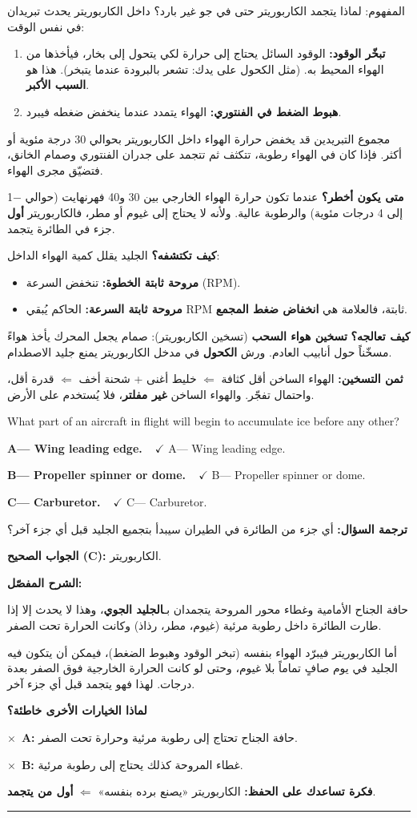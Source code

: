 \documentclass[11pt,a4paper]{article}
\newcommand{\en}[1]{\textenglish{#1}}
\newcommand{\correctletter}{}
\newcommand{\opt}[2]{%
  \ifdefstring{\correctletter}{#1}%
    {\textcolor{ansgreen}{\textbf{#1— #2\ \ $\checkmark$}}}%
    {#1— #2}\par}
\newcommand{\Q}[6]{%
  \renewcommand{\correctletter}{#6}%
  \par\bigskip
  \phantomsection\label{q#1}%
  \begin{tcolorbox}[enhanced,breakable,colback=qback,colframe=qframe,
      arc=2mm,boxrule=0.8pt,fonttitle=\bfseries,
      title={\en{Question #1}}]
    \begin{english}
      #2\par\smallskip
      \opt{A}{#3}\opt{B}{#4}\opt{C}{#5}
    \end{english}
  \end{tcolorbox}}
\newcommand{\tr}[1]{\textbf{\textcolor{qframe}{ترجمة السؤال:}} #1\par}
\newcommand{\ans}[2]{%
  \begin{tcolorbox}[colback=ansback,colframe=ansgreen,boxrule=0.6pt,arc=1.5mm,
      left=4pt,right=4pt,top=2pt,bottom=2pt]
    \textbf{\textcolor{ansgreen}{الجواب الصحيح (\en{#1}):}} #2
  \end{tcolorbox}}
\newcommand{\sharh}[1]{\textbf{\textcolor{conceptc}{الشرح المفصّل:}}\par #1\par}
\newcommand{\nohead}{\textbf{\textcolor{wrongc}{لماذا الخيارات الأخرى خاطئة؟}}\par}
\newcommand{\no}[2]{\hspace*{1em}\textcolor{wrongc}{$\times$}\ \textbf{\en{#1}:} #2\par}
\newcommand{\tip}[1]{%
  \begin{tcolorbox}[colback=tipback,colframe=tipframe,boxrule=0.5pt,arc=1.5mm,
      left=4pt,right=4pt,top=2pt,bottom=2pt]
    \textbf{فكرة تساعدك على الحفظ:} #1
  \end{tcolorbox}}
\newcommand{\qsep}{\par\medskip\noindent\textcolor{qframe!40}{\rule{\linewidth}{0.4pt}}\par}
\begin{document}
\begin{concept}{المفهوم: لماذا يتجمد الكاربوريتر حتى في جو غير بارد؟}
داخل الكاربوريتر يحدث تبريدان في نفس الوقت:
\begin{enumerate}[label=\arabic*.]
  \item \textbf{تبخّر الوقود:} الوقود السائل يحتاج إلى حرارة لكي يتحول إلى بخار، فيأخذها من الهواء المحيط به. (مثل الكحول على يدك: تشعر بالبرودة عندما يتبخر). هذا هو \textbf{السبب الأكبر}.
  \item \textbf{هبوط الضغط في الفنتوري:} الهواء يتمدد عندما ينخفض ضغطه فيبرد.
\end{enumerate}
مجموع التبريدين قد يخفض حرارة الهواء داخل الكاربوريتر بحوالي 30 درجة مئوية أو أكثر. فإذا كان في الهواء رطوبة، تتكثف ثم تتجمد على جدران الفنتوري وصمام الخانق، فتضيّق مجرى الهواء.

\textbf{متى يكون أخطر؟} عندما تكون حرارة الهواء الخارجي بين 30 و40 فهرنهايت (حوالي −1 إلى 4 درجات مئوية) والرطوبة عالية. ولأنه لا يحتاج إلى غيوم أو مطر، فالكاربوريتر \textbf{أول} جزء في الطائرة يتجمد.

\textbf{كيف تكتشفه؟} الجليد يقلل كمية الهواء الداخل:
\begin{itemize}
  \item \textbf{مروحة ثابتة الخطوة:} تنخفض السرعة (\en{RPM}).
  \item \textbf{مروحة ثابتة السرعة:} الحاكم يُبقي \en{RPM} ثابتة، فالعلامة هي \textbf{انخفاض ضغط المجمع}.
\end{itemize}

\textbf{كيف تعالجه؟} \textbf{تسخين هواء السحب} (تسخين الكاربوريتر): صمام يجعل المحرك يأخذ هواءً مسخّناً حول أنابيب العادم. ورش \textbf{الكحول} في مدخل الكاربوريتر يمنع جليد الاصطدام.

\textbf{ثمن التسخين:} الهواء الساخن أقل كثافة $\Leftarrow$ خليط أغنى + شحنة أخف $\Leftarrow$ قدرة أقل، واحتمال تفجّر. والهواء الساخن \textbf{غير مفلتر}، فلا يُستخدم على الأرض.
\end{concept}

\Q{8776}{What part of an aircraft in flight will begin to accumulate ice before any other?}
{Wing leading edge.}
{Propeller spinner or dome.}
{Carburetor.}{C}
\tr{أي جزء من الطائرة في الطيران سيبدأ بتجميع الجليد قبل أي جزء آخر؟}
\ans{C}{الكاربوريتر.}
\sharh{حافة الجناح الأمامية وغطاء محور المروحة يتجمدان بـ\textbf{الجليد الجوي}، وهذا لا يحدث إلا إذا طارت الطائرة داخل رطوبة مرئية (غيوم، مطر، رذاذ) وكانت الحرارة تحت الصفر.

أما الكاربوريتر فيبرّد الهواء بنفسه (تبخر الوقود وهبوط الضغط)، فيمكن أن يتكون فيه الجليد في يوم صافٍ تماماً بلا غيوم، وحتى لو كانت الحرارة الخارجية فوق الصفر بعدة درجات. لهذا فهو يتجمد قبل أي جزء آخر.}
\nohead
\no{A}{حافة الجناح تحتاج إلى رطوبة مرئية وحرارة تحت الصفر.}
\no{B}{غطاء المروحة كذلك يحتاج إلى رطوبة مرئية.}
\tip{الكاربوريتر «يصنع برده بنفسه» $\Leftarrow$ \textbf{أول من يتجمد}.}
\qsep
\end{document}
